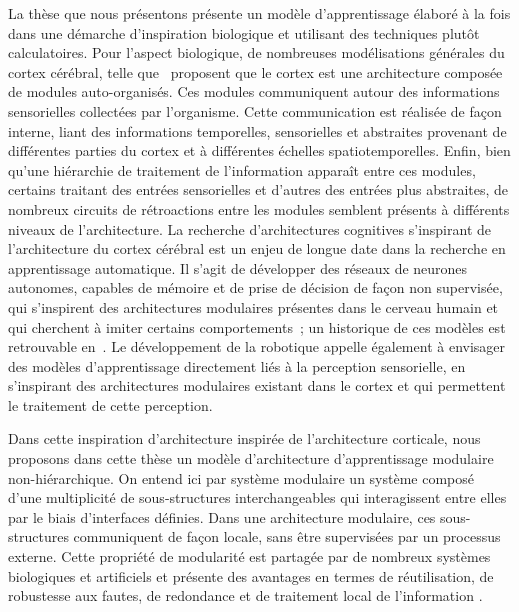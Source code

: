 La thèse que nous présentons présente un modèle d'apprentissage élaboré à la fois dans une démarche d'inspiration biologique et utilisant des techniques plutôt calculatoires.
Pour l'aspect biologique, de nombreuses modélisations générales du cortex cérébral, telle que~\cite{binzegger05, Meunier2009HierarchicalMI,sporns_structure_2013,betzel_multi-scale_2017} proposent que le cortex est une architecture composée de modules auto-organisés.
Ces modules communiquent autour des informations sensorielles collectées par l'organisme. Cette communication est réalisée de façon interne, liant des informations temporelles, sensorielles et abstraites provenant de différentes parties du cortex et à différentes échelles spatiotemporelles. Enfin, bien qu'une hiérarchie de traitement de l'information apparaît entre ces modules, certains traitant des entrées sensorielles et d'autres des entrées plus abstraites, de nombreux circuits de rétroactions entre les modules semblent présents à différents niveaux de l'architecture.
La recherche d'architectures cognitives s'inspirant de l'architecture du cortex cérébral est un enjeu de longue date dans la recherche en apprentissage automatique. Il s'agit de développer des réseaux de neurones autonomes, capables de mémoire et de prise de décision de façon non supervisée, qui s'inspirent des architectures modulaires présentes dans le cerveau humain et qui cherchent à imiter certains comportements~; un historique de ces modèles est retrouvable en~\cite{Kotseruba201840YO}.
Le développement de la robotique appelle également à envisager des modèles d'apprentissage directement liés à la perception sensorielle, en s'inspirant des architectures modulaires existant dans le cortex et qui permettent le traitement de cette perception.

Dans cette inspiration d'architecture inspirée de l'architecture corticale, nous proposons dans cette thèse un modèle d'architecture d'apprentissage modulaire non-hiérarchique.
On entend ici par système modulaire un système composé d'une multiplicité de sous-structures interchangeables qui interagissent entre elles par le biais d'interfaces définies. 
Dans une architecture modulaire, ces sous-structures communiquent de façon locale, sans être supervisées par un processus externe. Cette propriété de modularité est partagée par de nombreux systèmes biologiques et artificiels et présente des avantages en termes de réutilisation, de robustesse aux fautes, de redondance et de traitement local de l'information \cite{clune_evolutionary_2013}.


